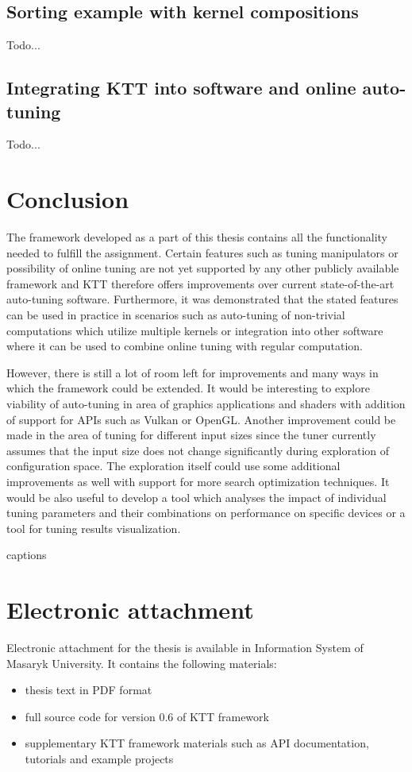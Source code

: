 \documentclass
[
    digital, %
    oneside, %
    table, %
    nolof, %
    nolot, %
    nocover %
]{fithesis3}
\begin{document}
\section{Sorting example with kernel compositions}
Todo...

\section{Integrating KTT into software and online auto-tuning}
Todo...

\chapter{Conclusion}
The framework developed as a part of this thesis contains all the functionality needed to fulfill the assignment. Certain features such as tuning
manipulators or possibility of online tuning are not yet supported by any other publicly available framework and KTT therefore offers improvements
over current state-of-the-art auto-tuning software. Furthermore, it was demonstrated that the stated features can be used in practice in scenarios
such as auto-tuning of non-trivial computations which utilize multiple kernels or integration into other software where it can be used to combine
online tuning with regular computation.

However, there is still a lot of room left for improvements and many ways in which the framework could be extended. It would be interesting to explore
viability of auto-tuning in area of graphics applications and shaders with addition of support for APIs such as Vulkan or OpenGL. Another improvement
could be made in the area of tuning for different input sizes since the tuner currently assumes that the input size does not change significantly during
exploration of configuration space. The exploration itself could use some additional improvements as well with support for more search optimization
techniques. It would be also useful to develop a tool which analyses the impact of individual tuning parameters and their combinations on performance on
specific devices or a tool for tuning results visualization.

\csname captions\languagename\endcsname
\makeatletter
\thesis@selectLocale{\thesis@locale}\makeatother
\printbibliography[heading=bibintoc]

\appendix
\chapter{Electronic attachment}
Electronic attachment for the thesis is available in Information System of Masaryk University. It contains the following materials:
\begin{itemize}
    \item thesis text in PDF format
    \item full source code for version 0.6 of KTT framework
    \item supplementary KTT framework materials such as API documentation, tutorials and example projects
\end{itemize}
\end{document}
